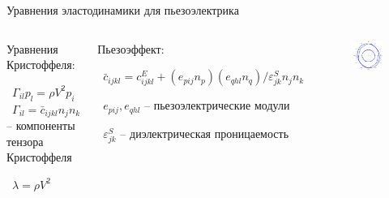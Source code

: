 \documentclass{beamer}
\begin{document}
\begin{frame}{Уравнения эластодинамики для пьезоэлектрика}
	
\begin{columns}
\column{7 cm}
	\begin{block}{Уравнения Кристоффеля:}

\ $\Gamma_{il} p_l = \rho V^2 p_i$\\

\ $\Gamma_{il} = \bar{c}_{ijkl} n_j n_k$ -- компоненты тензора Кристоффеля

\ $\lambda=\rho V^2$

  \end{block}
	
  \begin{block}{Пьезоэффект:}
	
\ $\bar{c}_{ijkl} = c_{ijkl}^E + (e_{pij} n_{p}) (e_{qhl} n_{q}) / \varepsilon_{jk}^S n_{j} n_{k}$

\ $e_{pij}, e_{qhl}$ -- пьезоэлектрические модули

\ $\varepsilon_{jk}^S$ -- диэлектрическая проницаемость

  \end{block}
	
\column{5 cm}
	
\begin{figure}

\includegraphics[width=5 cm]{linbo3_piezo.png}

\end{figure}

\end{columns}
\end{frame}

%
\end{document}
